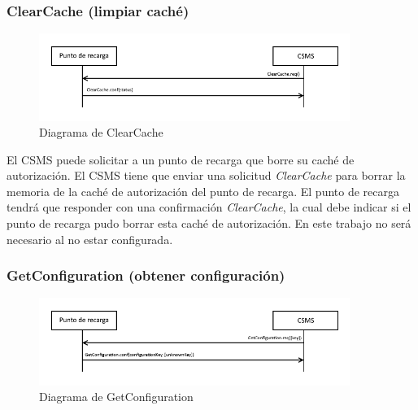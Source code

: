 \documentclass[12pt,a4paper,onecolumn,oneside]{report}
\begin{document}
\subsubsection{ClearCache (limpiar caché)}
\label{ClearCache (limpiar caché)}


\begin{figure}[H] 
\centering
  \includegraphics[width=0.9\textwidth]{figuras/diagramaclearcache.png}
  \caption[Diagrama de \textit{ClearCache}]{Diagrama de ClearCache\\
  }
  \label{fig:diagramaclearcache}
\end{figure}

El CSMS puede solicitar a un punto de recarga que borre su caché de autorización. El CSMS tiene que enviar una solicitud \textit{ClearCache} para borrar la memoria de la caché de autorización del punto de recarga. El punto de recarga tendrá que responder con una confirmación \textit{ClearCache}, la cual debe indicar si el punto de recarga pudo borrar esta caché de autorización. En este trabajo no será necesario al no estar configurada.


\subsubsection{GetConfiguration (obtener configuración)}
\label{GetConfiguration (obtener configuración)}



\begin{figure}[H] 
\centering
  \includegraphics[width=0.9\textwidth]{figuras/diagramagetconfiguration.png}
  \caption[Diagrama de \textit{GetConfiguration}]{Diagrama de GetConfiguration\\
  }
  \label{fig:diagramagetconfiguration}
\end{figure}
\end{document}
